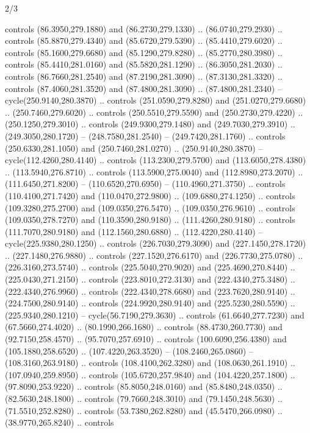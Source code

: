 \begin{flagdescription}{2/3}
\begin{scope}[xshift=0.5\flaglength,yshift=0.5\flagwidth,scale=\stretchfactor]
\begin{scope}[scale=0.001645\flagwidth,yshift=65mm,xshift=-63mm]
\begin{scope}[y=0.80pt, x=0.80pt, yscale=-1,]
\begin{scope}[cm={{1.33333,0.0,0.0,1.33333,(0.0,1e-05)}}]
  controls (86.3950,279.1880) and (86.2730,279.1330) .. (86.0740,279.2930) ..
  controls (85.8870,279.4340) and (85.6720,279.5390) .. (85.4410,279.6020) ..
  controls (85.1600,279.6680) and (85.1290,279.8280) .. (85.2770,280.3980) ..
  controls (85.4410,281.0160) and (85.5820,281.1290) .. (86.3050,281.2030) ..
  controls (86.7660,281.2540) and (87.2190,281.3090) .. (87.3130,281.3320) ..
  controls (87.4060,281.3520) and (87.4800,281.3090) .. (87.4800,281.2340) --
  cycle(250.9140,280.3870) .. controls (251.0590,279.8280) and
  (251.0270,279.6680) .. (250.7460,279.6020) .. controls (250.5510,279.5590) and
  (250.2730,279.4220) .. (250.1250,279.3010) .. controls (249.9300,279.1480) and
  (249.7030,279.3910) .. (249.3050,280.1720) -- (248.7580,281.2540) --
  (249.7420,281.1760) .. controls (250.6330,281.1050) and (250.7460,281.0270) ..
  (250.9140,280.3870) -- cycle(112.4260,280.4140) .. controls
  (113.2300,279.5700) and (113.6050,278.4380) .. (113.5940,276.8710) .. controls
  (113.5900,275.0040) and (112.8980,273.2070) .. (111.6450,271.8200) --
  (110.6520,270.6950) -- (110.4960,271.3750) .. controls (110.4100,271.7420) and
  (110.0470,272.9800) .. (109.6880,274.1250) .. controls (109.3280,275.2700) and
  (109.0350,276.5470) .. (109.0350,276.9610) .. controls (109.0350,278.7270) and
  (110.3590,280.9180) .. (111.4260,280.9180) .. controls (111.7070,280.9180) and
  (112.1560,280.6880) .. (112.4220,280.4140) -- cycle(225.9380,280.1250) ..
  controls (226.7030,279.3090) and (227.1450,278.1720) .. (227.1480,276.9880) ..
  controls (227.1520,276.6170) and (226.7730,275.0780) .. (226.3160,273.5740) ..
  controls (225.5040,270.9020) and (225.4690,270.8440) .. (225.0430,271.2150) ..
  controls (223.8010,272.3130) and (222.4340,275.3480) .. (222.4340,276.9960) ..
  controls (222.4340,278.6680) and (223.7620,280.9140) .. (224.7500,280.9140) ..
  controls (224.9920,280.9140) and (225.5230,280.5590) .. (225.9340,280.1210) --
  cycle(56.7190,279.3630) .. controls (61.6640,277.7230) and (67.5660,274.4020)
  .. (80.1990,266.1680) .. controls (88.4730,260.7730) and (92.7150,258.4570) ..
  (95.7070,257.6910) .. controls (100.6090,256.4380) and (105.1880,258.6520) ..
  (107.4220,263.3520) -- (108.2460,265.0860) -- (108.3160,263.9180) .. controls
  (108.4100,262.3280) and (108.0630,261.1910) .. (107.0940,259.8950) .. controls
  (105.6720,257.9840) and (104.4220,257.1800) .. (97.8090,253.9220) .. controls
  (85.8050,248.0160) and (85.8480,248.0350) .. (82.5630,248.1800) .. controls
  (79.7660,248.3010) and (79.1450,248.5630) .. (71.5510,252.8280) .. controls
  (53.7380,262.8280) and (45.5470,266.0980) .. (38.9770,265.8240) .. controls

\end{scope}
\end{scope}
\end{scope}
\end{scope}
\end{flagdescription}
